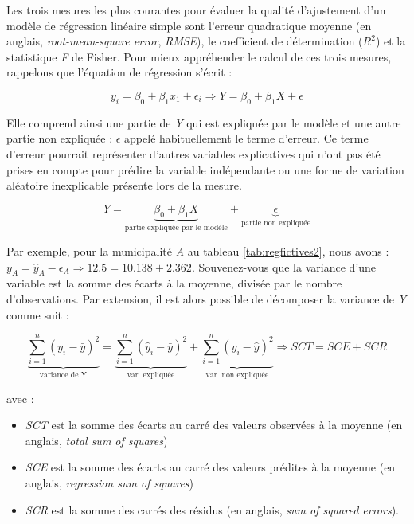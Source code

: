 \documentclass[
  11pt,
  french,
]{book}
\providecommand{\tightlist}{%
  \setlength{\itemsep}{0pt}\setlength{\parskip}{0pt}}
\begin{document}
Les trois mesures les plus courantes pour évaluer la qualité d'ajustement d'un modèle de régression linéaire simple sont l'erreur quadratique moyenne (en anglais, \emph{root-mean-square error}, \emph{RMSE}), le coefficient de détermination (\(R^2\)) et la statistique \emph{F} de Fisher. Pour mieux appréhender le calcul de ces trois mesures, rappelons que l'équation de régression s'écrit :

\begin{equation} 
y_i = \beta_0 + \beta_1 x_1+ \epsilon_i \Rightarrow Y= \beta_0 + \beta_1 X + \epsilon
\label{eq:reg2}
\end{equation}

Elle comprend ainsi une partie de \emph{Y} qui est expliquée par le modèle et une autre partie non expliquée : \(\epsilon\) appelé habituellement le terme d'erreur. Ce terme d'erreur pourrait représenter d'autres variables explicatives qui n'ont pas été prises en compte pour prédire la variable indépendante ou une forme de variation aléatoire inexplicable présente lors de la mesure.

\begin{equation} 
Y  = \underbrace{\beta_0 + \beta_1 X}_{\mbox{partie expliquée par le modèle}}+ \underbrace{\epsilon}_{\mbox{partie non expliquée}}
\label{eq:reg3}
\end{equation}

Par exemple, pour la municipalité \emph{A} au tableau \ref{tab:regfictives2}, nous avons : \(y_A = \widehat{y}_A - \epsilon_A \Rightarrow 12.5 = 10.138+2.362\). Souvenez-vous que la variance d'une variable est la somme des écarts à la moyenne, divisée par le nombre d'observations. Par extension, il est alors possible de décomposer la variance de \emph{Y} comme suit :

\begin{equation} 
\underbrace{\sum_{i=1}^n (y_{i}-\bar{y})^2}_{\mbox{variance de Y}} = \underbrace{\sum_{i=1}^n (\widehat{y}_i-\bar{y})^2}_{\mbox{var. expliquée}} + \underbrace{\sum_{i=1}^n (y_{i}-\widehat{y})^2}_{\mbox{var. non expliquée}} \Rightarrow 
SCT = SCE + SCR
\label{eq:reg4}
\end{equation}

avec :

\begin{itemize}
\tightlist
\item
  \emph{SCT} est la somme des écarts au carré des valeurs observées à la moyenne (en anglais, \emph{total sum of squares})
\item
  \emph{SCE} est la somme des écarts au carré des valeurs prédites à la moyenne (en anglais, \emph{regression sum of squares})
\item
  \emph{SCR} est la somme des carrés des résidus (en anglais, \emph{sum of squared errors}).
\end{itemize}
\end{document}
